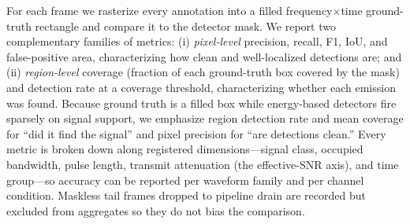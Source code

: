 For each frame we rasterize every annotation into a filled frequency$\times$time
ground-truth rectangle and compare it to the detector mask. We report two
complementary families of metrics: (i) \emph{pixel-level} precision, recall, F1,
IoU, and false-positive area, characterizing how clean and well-localized
detections are; and (ii) \emph{region-level} coverage (fraction of each
ground-truth box covered by the mask) and detection rate at a coverage threshold,
characterizing whether each emission was found. Because ground truth is a filled
box while energy-based detectors fire sparsely on signal support, we emphasize
region detection rate and mean coverage for ``did it find the signal'' and pixel
precision for ``are detections clean.'' Every metric is broken down along
registered dimensions---signal class, occupied bandwidth, pulse length, transmit
attenuation (the effective-SNR axis), and time group---so accuracy can be reported
per waveform family and per channel condition. Maskless tail frames dropped to pipeline drain
are recorded but excluded from aggregates so they do not bias the comparison.
